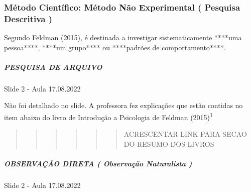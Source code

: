 \documentclass[
]{book}
\begin{document}
\hypertarget{muxe9todo-cientuxedfico-muxe9todo-nuxe3o-experimental-pesquisa-descritiva}{%
\subsubsection{Método Científico: Método Não Experimental ( Pesquisa Descritiva )}\label{muxe9todo-cientuxedfico-muxe9todo-nuxe3o-experimental-pesquisa-descritiva}}

Segundo Feldman (2015), é destinada a investigar sistematicamente ****uma pessoa****, ****um grupo**** ou ****padrões de comportamento****.

\hypertarget{pesquisa-de-arquivo}{%
\subparagraph{PESQUISA DE ARQUIVO}\label{pesquisa-de-arquivo}}

Slide 2 - Aula 17.08.2022

Não foi detalhado no slide. A professora fez explicações que estão contidas no item abaixo do livro de Introdução a Psicologia de Feldman (2015)\textsuperscript{1}

\begin{quote}
\begin{quote}
\begin{quote}
\begin{quote}
\begin{quote}
\begin{quote}
ACRESCENTAR LINK PARA SECAO DO RESUMO DOS LIVROS
\end{quote}
\end{quote}
\end{quote}
\end{quote}
\end{quote}
\end{quote}

\hypertarget{observauxe7uxe3o-direta-observauxe7uxe3o-naturalista}{%
\subparagraph{OBSERVAÇÃO DIRETA ( Observação Naturalista )}\label{observauxe7uxe3o-direta-observauxe7uxe3o-naturalista}}

Slide 2 - Aula 17.08.2022
\end{document}
